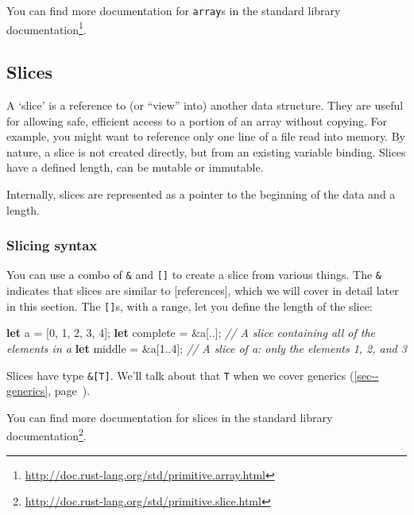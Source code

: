 \documentclass[a4paper,]{book}
\renewcommand*{\hyperref}[2][\ar]{%
  \def\ar{#2}%
  #2 (\autoref{#1}, page~\pageref{#1})}
\newenvironment{Shaded}{\begin{snugshade}}{\end{snugshade}}
\newcommand{\KeywordTok}[1]{\textcolor[rgb]{0.13,0.29,0.53}{\textbf{{#1}}}}
\newcommand{\DecValTok}[1]{\textcolor[rgb]{0.00,0.00,0.81}{{#1}}}
\newcommand{\CommentTok}[1]{\textcolor[rgb]{0.56,0.35,0.01}{\textit{{#1}}}}
\newcommand{\NormalTok}[1]{{#1}}
\renewcommand{\href}[2]{#2\footnote{\url{#1}}}
\begin{document}
You can find more documentation for \texttt{array}s
\href{http://doc.rust-lang.org/std/primitive.array.html}{in the standard
library documentation}.

\subsection{Slices}\label{slices}

A `slice' is a reference to (or ``view'' into) another data structure.
They are useful for allowing safe, efficient access to a portion of an
array without copying. For example, you might want to reference only one
line of a file read into memory. By nature, a slice is not created
directly, but from an existing variable binding. Slices have a defined
length, can be mutable or immutable.

Internally, slices are represented as a pointer to the beginning of the
data and a length.

\subsubsection{Slicing syntax}\label{slicing-syntax}

You can use a combo of \texttt{\&} and \texttt{{[}{]}} to create a slice
from various things. The \texttt{\&} indicates that slices are similar
to {[}references{]}, which we will cover in detail later in this
section. The \texttt{{[}{]}}s, with a range, let you define the length
of the slice:

\begin{Shaded}
\begin{Highlighting}[]
\KeywordTok{let} \NormalTok{a = [}\DecValTok{0}\NormalTok{, }\DecValTok{1}\NormalTok{, }\DecValTok{2}\NormalTok{, }\DecValTok{3}\NormalTok{, }\DecValTok{4}\NormalTok{];}
\KeywordTok{let} \NormalTok{complete = &a[..]; }\CommentTok{// A slice containing all of the elements in a}
\KeywordTok{let} \NormalTok{middle = &a[}\DecValTok{1.}\NormalTok{.}\DecValTok{4}\NormalTok{]; }\CommentTok{// A slice of a: only the elements 1, 2, and 3}
\end{Highlighting}
\end{Shaded}

Slices have type \texttt{\&{[}T{]}}. We'll talk about that \texttt{T}
when we cover \hyperref[sec--generics]{generics}.

You can find more documentation for slices
\href{http://doc.rust-lang.org/std/primitive.slice.html}{in the standard
library documentation}.
\end{document}
